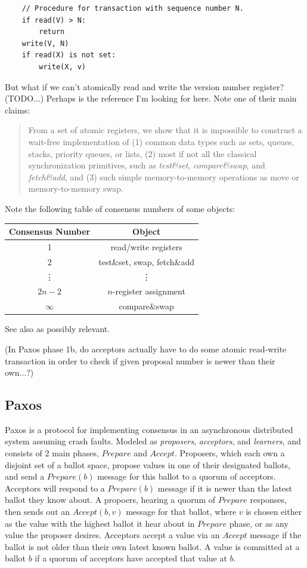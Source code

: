 \documentclass[10pt,a4paper]{article}
\begin{document}
\begin{verbatim}
    // Procedure for transaction with sequence number N.
    if read(V) > N:
        return
    write(V, N)
    if read(X) is not set:
        write(X, v)
\end{verbatim}
But what if we can't atomically read and write the version number register? (TODO...) Perhaps \cite{1991waitfreesync} is the reference I'm looking for here. Note one of their main claims:
\begin{quote}
    From a set of atomic registers, we show that it is impossible to construct a wait-free implementation of (1) common data types such as sets, queues, stacks, priority queues, or lists, (2) most if not all the classical synchronization primitives, such as \textit{test\&set}, \textit{compare\&swap}, and \textit{fetch\&add}, and (3) such simple memory-to-memory operations as move or memory-to-memory swap.
\end{quote}
Note the following table of consensus numbers of some objects:
\begin{center}
    \begin{tabular}{c | c}
        Consensus Number & Object \\\hline
        1 & read/write registers \\ \hline
        2 & test\&set, swap, fetch\&add \\ \hline
        \vdots & \vdots \\ \hline
        $2n-2$ & $n$-register assignment \\ \hline
        $\infty$ & compare\&swap
    \end{tabular}
\end{center}
See also \cite{1990aspnesherlihy} as possibly relevant.

(In Paxos phase 1b, do acceptors actually have to do some atomic read-write transaction in order to check if given proposal number is newer than their own...?) 

\subsection{Paxos}

Paxos is a protocol for implementing consensus in an asynchronous distributed system assuming crash faults. Modeled as \textit{proposers}, \textit{acceptors}, and \textit{learners}, and consists of 2 main phases, $Prepare$ and $Accept$. Proposers, which each own a disjoint set of a ballot space, propose values in one of their designated ballots, and send a $Prepare(b)$ message for this ballot to a quorum of acceptors. Acceptors will respond to a $Prepare(b)$ message if it is newer than the latest ballot they know about. A propoers, hearing a quorum of $Prepare$ responses, then sends out an $Accept(b,v)$ message for that ballot, where $v$ is chosen either as the value with the highest ballot it hear about in $Prepare$ phase, or as any value the proposer desires. Acceptors accept a value via an $Accept$ message if the ballot is not older than their own latest known ballot. A value is committed at a ballot $b$ if a quorum of acceptors have accepted that value at $b$.
\end{document}
